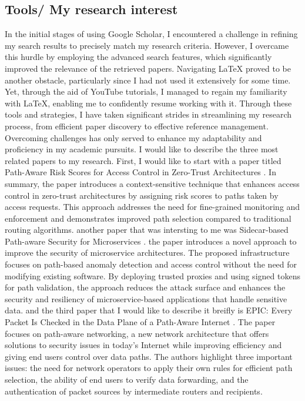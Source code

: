 \documentclass{article}
\begin{document}
\begin{text}
\section{Tools/ My research interest}
\begin{text}
In the initial stages of using Google Scholar, I encountered a challenge in refining my search results to precisely match my research criteria. However, I overcame this hurdle by employing the advanced search features, which significantly improved the relevance of the retrieved papers.
Navigating LaTeX proved to be another obstacle, particularly since I had not used it extensively for some time. Yet, through the aid of YouTube tutorials, I managed to regain my familiarity with LaTeX, enabling me to confidently resume working with it.
Through these tools and strategies, I have taken significant strides in streamlining my research process, from efficient paper discovery to effective reference management. Overcoming challenges has only served to enhance my adaptability and proficiency in my academic pursuits.
I would like to describe the three most related papers to my research. First, I would like to start with a paper titled Path-Aware Risk Scores for Access Control in
Zero-Trust Architectures 
\cite{seaton2022poster}. In summary, the paper introduces a context-sensitive technique that enhances access control in zero-trust architectures by assigning risk scores to paths taken by access requests. This approach addresses the need for fine-grained monitoring and enforcement and demonstrates improved path selection compared to traditional routing algorithms.
another paper that was intersting to me was Sidecar-based Path-aware Security for Microservices \cite{meadows2023sidecar}. the paper introduces a novel approach to improve the security of microservice architectures. The proposed infrastructure focuses on path-based anomaly detection and access control without the need for modifying existing software. By deploying trusted proxies and using signed tokens for path validation, the approach reduces the attack surface and enhances the security and resiliency of microservice-based applications that handle sensitive data.
and the third paper that I would like to describe it breifly is EPIC: Every Packet Is Checked in the Data Plane of a Path-Aware Internet \cite{legner2020epic}. The paper focuses on path-aware networking, a new network architecture that offers solutions to security issues in today's Internet while improving efficiency and giving end users control over data paths. The authors highlight three important issues: the need for network operators to apply their own rules for efficient path selection, the ability of end users to verify data forwarding, and the authentication of packet sources by intermediate routers and recipients. 
\end{text}


\end{text}
\end{document}

